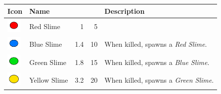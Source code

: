 \begin{table}[H]
    \centering
    \begin{tabular}{m{9mm}m{25mm}D{.}{.}{-1}rm{0.48\textwidth}}
        \toprule
        \textbf{Icon}                                                                 & \textbf{Name}                          &  &  & \textbf{Description}                                                                                                                                        \\
        \midrule
        \includegraphics[height=7mm]{img/Icons/Attackers/Red Slime.png}               & \footnotesize{Red Slime}               & 1                   & 5                &                                                                                                                                                             \\
        \includegraphics[height=7mm]{img/Icons/Attackers/Blue Slime.png}              & \footnotesize{Blue Slime}              & 1.4                 & 10               & \footnotesize{When killed, spawns a \emph{Red Slime}.}                                                                                                      \\
        \includegraphics[height=7mm]{img/Icons/Attackers/Green Slime.png}             & \footnotesize{Green Slime}             & 1.8                 & 15               & \footnotesize{When killed, spawns a \emph{Blue Slime}.}                                                                                                     \\
        \includegraphics[height=7mm]{img/Icons/Attackers/Yellow Slime.png}            & \footnotesize{Yellow Slime}            & 3.2                 & 20               & \footnotesize{When killed, spawns a \emph{Green Slime}.}                                                                                                    \\

\end{tabular}
\end{table}
